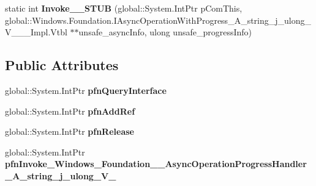\begin{DoxyCompactItemize}
\item 
\mbox{\label{struct_windows_1_1_foundation_1_1_async_operation_progress_handler___a__string__j__ulong___v_______impl_1_1_vtbl_a686fb967b2fd321781aac86ac6ffb2c2}} 
static int {\bfseries Invoke\+\_\+\+\_\+\+S\+T\+UB} (global\+::\+System.\+Int\+Ptr p\+Com\+This, global\+::\+Windows.\+Foundation.\+I\+Async\+Operation\+With\+Progress\+\_\+\+A\+\_\+string\+\_\+j\+\_\+ulong\+\_\+\+V\+\_\+\+\_\+\+\_\+\+Impl.\+Vtbl $\ast$$\ast$unsafe\+\_\+async\+Info, ulong unsafe\+\_\+progress\+Info)
\end{DoxyCompactItemize}
\subsection*{Public Attributes}
\begin{DoxyCompactItemize}
\item 
\mbox{\label{struct_windows_1_1_foundation_1_1_async_operation_progress_handler___a__string__j__ulong___v_______impl_1_1_vtbl_a7fc0abe3adb102d805eb646273211746}} 
global\+::\+System.\+Int\+Ptr {\bfseries pfn\+Query\+Interface}
\item 
\mbox{\label{struct_windows_1_1_foundation_1_1_async_operation_progress_handler___a__string__j__ulong___v_______impl_1_1_vtbl_a97ab8a0c982dc1d8a3e6f94e9d31b2c7}} 
global\+::\+System.\+Int\+Ptr {\bfseries pfn\+Add\+Ref}
\item 
\mbox{\label{struct_windows_1_1_foundation_1_1_async_operation_progress_handler___a__string__j__ulong___v_______impl_1_1_vtbl_a82c4003be3e17b6aae95bd4dd63e4c5a}} 
global\+::\+System.\+Int\+Ptr {\bfseries pfn\+Release}
\item 
\mbox{\label{struct_windows_1_1_foundation_1_1_async_operation_progress_handler___a__string__j__ulong___v_______impl_1_1_vtbl_aa95bcba54acfce98d00a9b35cdbc6744}} 
global\+::\+System.\+Int\+Ptr {\bfseries pfn\+Invoke\+\_\+\+Windows\+\_\+\+Foundation\+\_\+\+\_\+\+Async\+Operation\+Progress\+Handler\+\_\+\+A\+\_\+string\+\_\+j\+\_\+ulong\+\_\+\+V\+\_\+}
\end{DoxyCompactItemize}
